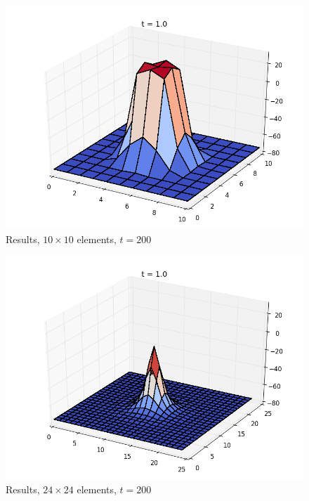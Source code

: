 \begin{figure}[ht]
  \centering
  \includegraphics[width=0.9\columnwidth]{examples/example-0401/doc/figures/current_run_l1x1_n10x10_i1_s0_p1__t200.png}
  \caption{Results, $10 \times 10$ elements, $t=200$}
  \label{example-0401-current-run1-fig}
\end{figure}

\begin{figure}[ht]
  \centering
  \includegraphics[width=0.9\columnwidth]{examples/example-0401/doc/figures/current_run_l1x1_n24x24_i1_s0_p1__t200.png}
  \caption{Results, $24 \times 24$ elements, $t=200$}
  \label{example-0401-current-run2-fig}
\end{figure}

